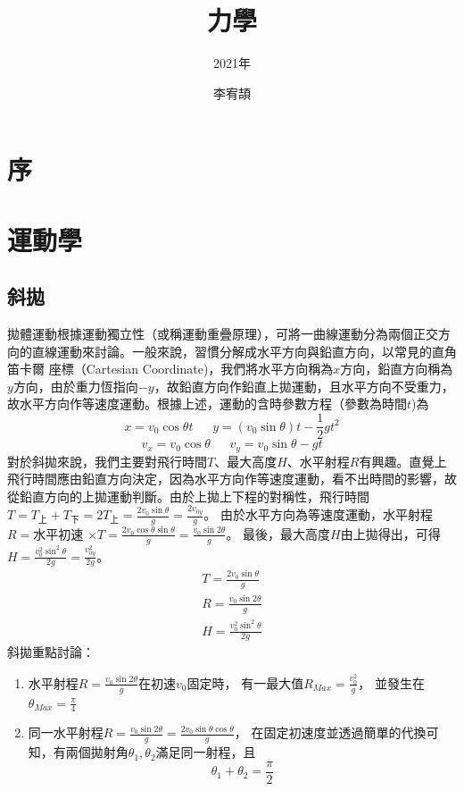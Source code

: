 \documentclass[cn,10pt,math=newtx,chinesefont=founder]{../elegantbook}
\title{力學}
\subtitle{2021年}
\author{李宥頡}
\institute{National Taiwan University}
\begin{document}
\maketitle
\frontmatter

\chapter*{序}
\tableofcontents

\mainmatter

\chapter{運動學}
\section{斜拋}
拋體運動根據運動獨立性（或稱運動重疊原理），可將一曲線運動分為兩個正交方向的直線運動來討論。一般來說，習慣分解成水平方向與鉛直方向，以常見的直角笛卡爾
座標（Cartesian Coordinate)，我們將水平方向稱為$x$方向，鉛直方向稱為$y$方向，由於重力恆指向$-y$，故鉛直方向作鉛直上拋運動，且水平方向不受重力，
故水平方向作等速度運動。根據上述，運動的含時參數方程（參數為時間$t$)為
\begin{equation}\label{1.1}
    x = v_0 \cos\theta t\ \ \ \ \ \ \ y = (v_0 \sin\theta)t -\frac{1}{2}gt^2
\end{equation}
\begin{equation}
    v_x = v_0 \cos\theta \ \ \ \ \ \ \ v_y = v_0 \sin\theta - gt
\end{equation}
對於斜拋來說，我們主要對飛行時間$T$、最大高度$H$、水平射程$R$有興趣。直覺上飛行時間應由鉛直方向決定，因為水平方向作等速度運動，看不出時間的影響，故
從鉛直方向的上拋運動判斷。由於上拋上下程的對稱性，飛行時間$T=T_{上}+T_{下}=2T_{上}=\frac{2v_0 \sin\theta}{g}=\frac{2v_{0y}}{g}$。
由於水平方向為等速度運動，水平射程$R = $水平初速 $\times T = \frac{2 v_0 \cos\theta \sin\theta}{g} = \frac{v_0 \sin 2\theta}{g}$。
最後，最大高度$H$由上拋得出，可得$H=\frac{v_0^2 \sin^2\theta}{2g}=\frac{v_{0y}^2}{2g}$。\\
\begin{equation}
\begin{array}{l}
    T = \frac{2v_0 \sin\theta}{g} \\
    R = \frac{v_0 \sin 2\theta}{g} \\
    H = \frac{v_0^2 \sin^2\theta}{2g}
\end{array}
\end{equation}
斜拋重點討論：
\begin{enumerate}
    \item 水平射程$R = \frac{v_0 \sin 2\theta}{g}$在初速$v_0$固定時，
          有一最大值$R_{Max}=\frac{v_0^2}{g}$，
          並發生在$\theta_{Max}=\frac{\pi}{4}$
    \item 同一水平射程$R = \frac{v_0 \sin 2\theta}{g}=\frac{2v_0 \sin \theta \cos \theta}{g}$，
          在固定初速度並透過簡單的代換可知，有兩個拋射角$\theta_1 , \theta_2$滿足同一射程，且
          \begin{equation} \label{1.4}
            \theta_1+\theta_2 = \frac{\pi}{2}
          \end{equation}
\end{enumerate}
\end{document}
